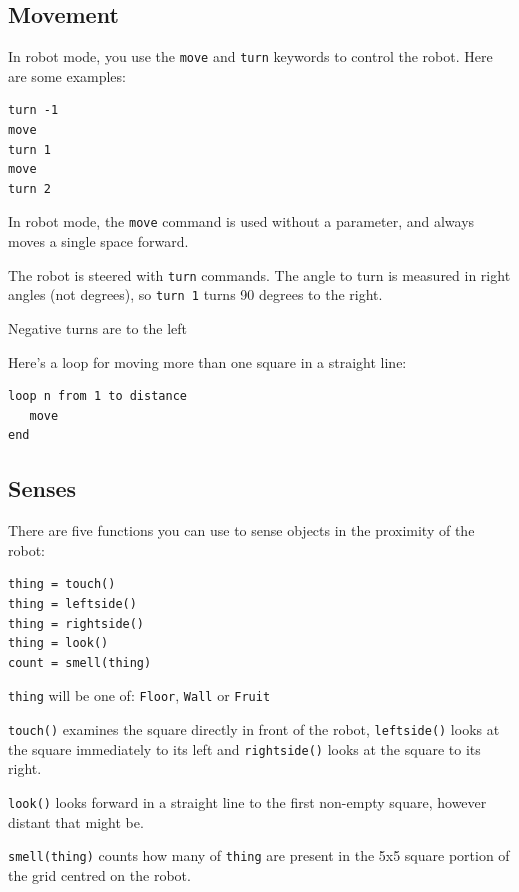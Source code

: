 \documentclass[12pt,a4paper,twoside]{article}
\renewcommand{\_}{\texttt{\symbol{95}}}
\begin{document}
\subsection{Movement}

In robot mode, you use the \verb^move^ and \verb^turn^
keywords to control the robot. Here are some examples:

\begin{verbatim}
turn -1
move
turn 1
move
turn 2
\end{verbatim}

\begin{bulletlist}
\item In robot mode, the \verb^move^ command is used without a
	parameter, and always moves a single space forward.
\item The robot is steered with \verb^turn^ commands. 
	The angle to turn is measured in right angles (not degrees),
	so \texttt{turn 1} turns 90 degrees to the right.
\item Negative turns are to the left
\end{bulletlist}

Here's a loop for moving more than one square
in a straight line:

\begin{verbatim}
loop n from 1 to distance
   move
end
\end{verbatim}

\subsection{Senses}

There are five functions you can use to sense objects in the proximity
of the robot:

\begin{verbatim}
thing = touch()
thing = leftside()
thing = rightside()
thing = look()
count = smell(thing)
\end{verbatim}

\begin{bulletlist}
\item \texttt{thing} will be one of:
	\texttt{Floor}, \texttt{Wall} or \texttt{Fruit}

\item \texttt{touch()} examines the square directly in front of the
	robot, \texttt{leftside()} looks at the square immediately to its
	left and \texttt{rightside()} looks at the square to its right.

\item \texttt{look()} looks forward in a straight line to the first
	non-empty square, however distant that might be.

\item \texttt{smell(thing)} counts how many of \texttt{thing} are present
	in the 5x5 square portion of the grid centred on the robot.
\end{bulletlist}
\end{document}

